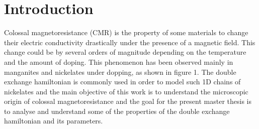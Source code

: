 \documentclass[12pt,twoside]{report}
\begin{document}
	\thispagestyle{empty}
	\tableofcontents
		\thispagestyle{empty}
	\chapter*{Introduction}
	\setcounter{page}{1}
	\setlength{\parskip}{-1mm}
	
	Colossal magnetoresistance (CMR) is the property of some materials to change
	their electric conductivity drastically under the presence of a magnetic
	field.  This change could be by several orders of magnitude depending on the
	temperature and the amount of doping. This phenomenon has been observed
	mainly in manganites and nickelates under dopping, as shown in figure 1. The
	double exchange hamiltonian is commonly used in order to model such 1D chains of
	nickelates and the main objective of this work is to understand the
	microscopic origin of colossal magnetoresistance and the goal for the
	present master thesis is to analyse and understand some of the properties of
	the double exchange hamiltonian and its parameters.
	 
\end{document}

